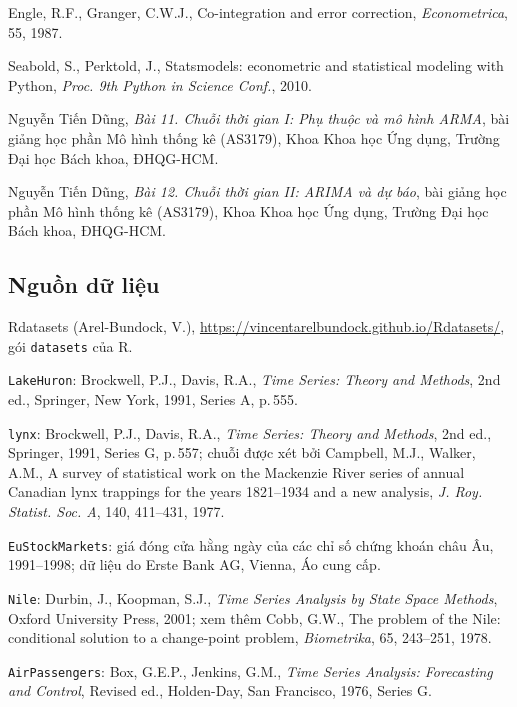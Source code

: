 \begin{enumerate}[label={[\arabic*]},leftmargin=1.2cm,itemsep=1pt,topsep=2pt]
\item \hypertarget{tl12}{}Engle, R.F., Granger, C.W.J., Co-integration and error correction, \textit{Econometrica}, 55, 1987.
\item \hypertarget{tl13}{}Seabold, S., Perktold, J., Statsmodels: econometric and statistical modeling with Python, \textit{Proc. 9th Python in Science Conf.}, 2010.
\item \hypertarget{tl14}{}Nguyễn Tiến Dũng, \textit{Bài 11. Chuỗi thời gian I: Phụ thuộc và mô hình ARMA}, bài giảng học phần Mô hình thống kê (AS3179), Khoa Khoa học Ứng dụng, Trường Đại học Bách khoa, ĐHQG-HCM.
\item \hypertarget{tl15}{}Nguyễn Tiến Dũng, \textit{Bài 12. Chuỗi thời gian II: ARIMA và dự báo}, bài giảng học phần Mô hình thống kê (AS3179), Khoa Khoa học Ứng dụng, Trường Đại học Bách khoa, ĐHQG-HCM.
\end{enumerate}

\subsection*{Nguồn dữ liệu}
\begin{enumerate}[label={[DL\arabic*]},leftmargin=1.2cm,itemsep=1pt,topsep=2pt]
\item \hypertarget{dl1}{}Rdatasets (Arel-Bundock, V.), \url{https://vincentarelbundock.github.io/Rdatasets/}, gói \texttt{datasets} của R.
\item \hypertarget{dl2}{}\texttt{LakeHuron}: Brockwell, P.J., Davis, R.A., \textit{Time Series: Theory and Methods}, 2nd ed., Springer, New York, 1991, Series A, p.\,555.
\item \hypertarget{dl3}{}\texttt{lynx}: Brockwell, P.J., Davis, R.A., \textit{Time Series: Theory and Methods}, 2nd ed., Springer, 1991, Series G, p.\,557; chuỗi được xét bởi Campbell, M.J., Walker, A.M., A survey of statistical work on the Mackenzie River series of annual Canadian lynx trappings for the years 1821--1934 and a new analysis, \textit{J. Roy. Statist. Soc. A}, 140, 411--431, 1977.
\item \hypertarget{dl4}{}\texttt{EuStockMarkets}: giá đóng cửa hằng ngày của các chỉ số chứng khoán châu Âu, 1991--1998; dữ liệu do Erste Bank AG, Vienna, Áo cung cấp.
\item \hypertarget{dl5}{}\texttt{Nile}: Durbin, J., Koopman, S.J., \textit{Time Series Analysis by State Space Methods}, Oxford University Press, 2001; xem thêm Cobb, G.W., The problem of the Nile: conditional solution to a change-point problem, \textit{Biometrika}, 65, 243--251, 1978.
\item \hypertarget{dl6}{}\texttt{AirPassengers}: Box, G.E.P., Jenkins, G.M., \textit{Time Series Analysis: Forecasting and Control}, Revised ed., Holden-Day, San Francisco, 1976, Series G.
\end{enumerate}
\endgroup
\clearpage
{}
